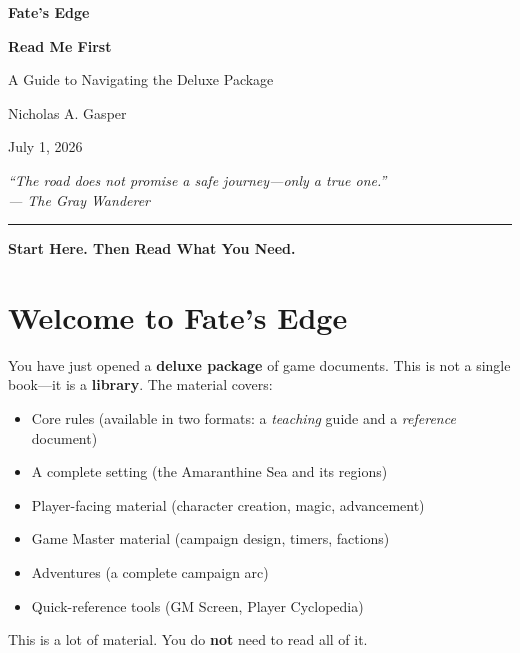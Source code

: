 \documentclass[10pt]{article}
\begin{document}
\begin{center}
\vspace*{2cm}
{\Huge \textbf{Fate's Edge}}

\vspace{0.5cm}
{\huge \textbf{Read Me First}}

\vspace{0.3cm}
{\Large A Guide to Navigating the Deluxe Package}

\vspace{1cm}
{\large Nicholas A. Gasper}

\vspace{0.3cm}
{\large July 1, 2026}

\vspace{2cm}
{\itshape
``The road does not promise a safe journey---only a true one.'' \\
--- The Gray Wanderer
}

\vspace{2cm}
\rule{0.4\textwidth}{0.5pt}

\vspace{1cm}
{\large \textbf{Start Here. Then Read What You Need.}}
\end{center}

\newpage

\section*{Welcome to Fate's Edge}

You have just opened a \textbf{deluxe package} of game documents. This is not a single book---it is a \textbf{library}. The material covers:

\begin{itemize}
\item Core rules (available in two formats: a \textit{teaching} guide and a \textit{reference} document)
\item A complete setting (the Amaranthine Sea and its regions)
\item Player-facing material (character creation, magic, advancement)
\item Game Master material (campaign design, timers, factions)
\item Adventures (a complete campaign arc)
\item Quick-reference tools (GM Screen, Player Cyclopedia)
\end{itemize}

\noindent
This is a lot of material. You do \textbf{not} need to read all of it.
\end{document}
